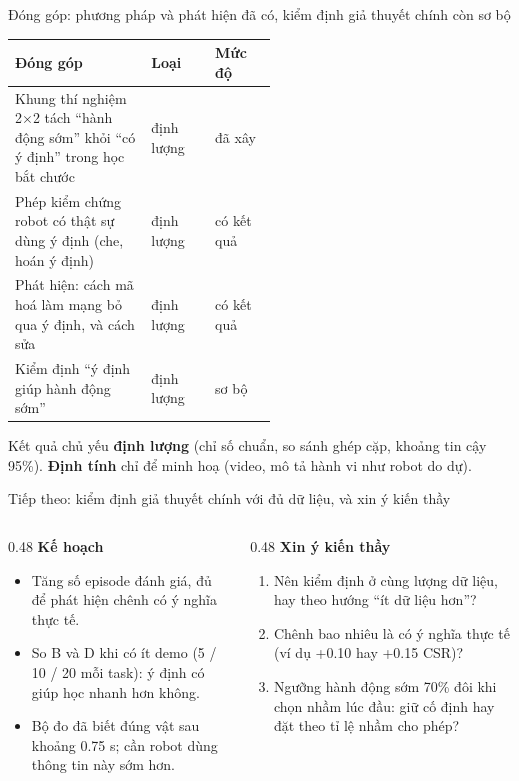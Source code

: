 \begin{frame}{Đóng góp: phương pháp và phát hiện đã có, kiểm định giả thuyết chính còn sơ bộ}
  \centering\small
  \begin{tabular}{@{}>{\raggedright\arraybackslash}p{0.52\linewidth}ll@{}}
    \toprule
    Đóng góp & Loại & Mức độ \\
    \midrule
    Khung thí nghiệm 2$\times$2 tách ``hành động sớm'' khỏi ``có ý định'' trong học bắt chước & định lượng & \done{} đã xây \\
    Phép kiểm chứng robot có thật sự dùng ý định (che, hoán ý định) & định lượng & \done{} có kết quả \\
    Phát hiện: cách mã hoá làm mạng bỏ qua ý định, và cách sửa & định lượng & \done{} có kết quả \\
    Kiểm định ``ý định giúp hành động sớm'' & định lượng & \half{} sơ bộ \\
    \bottomrule
  \end{tabular}

  \vspace{0.6em}
  \raggedright
  Kết quả chủ yếu \textbf{định lượng} (chỉ số chuẩn, so sánh ghép cặp, khoảng tin cậy 95\%). \textbf{Định tính} chỉ để minh hoạ (video, mô tả hành vi như robot do dự).
\end{frame}

\begin{frame}{Tiếp theo: kiểm định giả thuyết chính với đủ dữ liệu, và xin ý kiến thầy}
  \begin{columns}[T]
    \begin{column}{0.48\textwidth}
      \small\textbf{Kế hoạch}
      \begin{itemize}
        \item Tăng số episode đánh giá, đủ để phát hiện chênh có ý nghĩa thực tế.
        \item So B và D khi có ít demo (5 / 10 / 20 mỗi task): ý định có giúp học nhanh hơn không.
        \item Bộ đo đã biết đúng vật sau khoảng 0.75 s; cần robot dùng thông tin này sớm hơn.
      \end{itemize}
    \end{column}
    \begin{column}{0.48\textwidth}
      \small\textbf{Xin ý kiến thầy}
      \begin{enumerate}
        \item Nên kiểm định ở cùng lượng dữ liệu, hay theo hướng ``ít dữ liệu hơn''?
        \item Chênh bao nhiêu là có ý nghĩa thực tế (ví dụ +0.10 hay +0.15 CSR)?
        \item Ngưỡng hành động sớm 70\% đôi khi chọn nhầm lúc đầu: giữ cố định hay đặt theo tỉ lệ nhầm cho phép?
      \end{enumerate}
    \end{column}
  \end{columns}
\end{frame}


